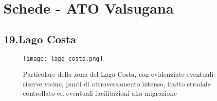 \documentclass[11pt,a4paper,twoside]{memoir}
\begin{document}
\newpage
\section{Schede - ATO Valsugana}
\begin{tcolorbox}[breakable,colback=white,colframe=green,width=10cm]
\subsection{19.Lago Costa}
\end{tcolorbox}

\begin{figure}[H]
\label{fig:map_lago_costa}
\centering
  \texttt{[image: lago\_costa.png]}
\caption{Particolare della zona del Lago Costa, con evidenziate eventuali riserve vicine, punti di attraversamento intenso, tratto stradale controllato ed eventuali facilitazioni alla migrazione}
\end{figure}
\end{document}

